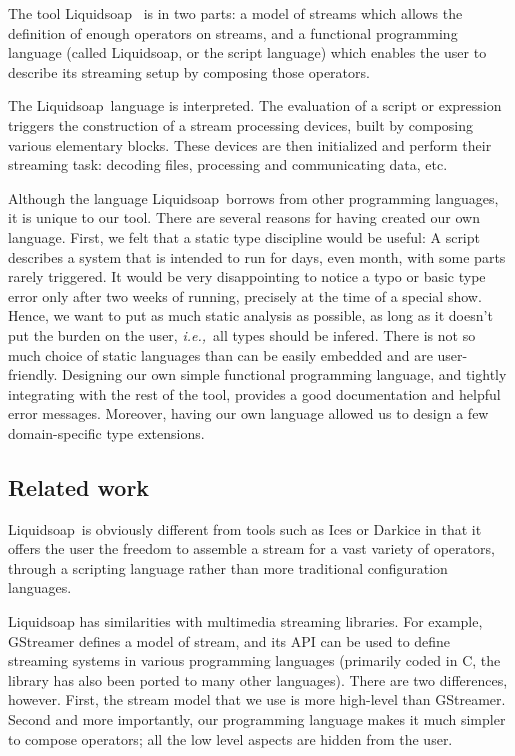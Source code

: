 \documentclass{llncs}
\newcommand{\liquidsoap}{Liquidsoap}
\newcommand{\ie}{{\em i.e.,}}
\begin{document}
The tool \liquidsoap\ \cite{liquidsoap} is in two parts:
  a model of streams which allows the definition of enough
  operators on streams, and a functional programming language
  (called \liquidsoap, or the script language) which enables
  the user to describe its streaming setup by composing those operators.

The \liquidsoap\ language is interpreted.
The evaluation of a script or expression triggers the construction
of a stream processing devices, built by composing various elementary
blocks.
These devices are then initialized and perform their streaming task:
decoding files, processing and communicating data, etc.


Although the language \liquidsoap\ borrows from other programming
languages, it is unique to our tool.
There are several reasons for having created our own language.
First, we felt that a static type discipline would be useful:
A script describes a system that is intended to run for days,
even month, with some parts rarely triggered.
It would be very disappointing to notice a typo or basic type
error only after two weeks of running, precisely at the time
of a special show.
Hence, we want to put as much static analysis as possible,
as long as it doesn't put the burden on the user,
\ie\ all types should be infered.
There is not so much choice of static languages than can be
easily embedded and are user-friendly.
Designing our own simple functional programming language,
and tightly integrating with the rest of the tool,
provides a good documentation and helpful error messages.
Moreover, having our own language allowed us to design
a few domain-specific type extensions.

\subsection{Related work}

\liquidsoap\ is obviously different from tools such as Ices or Darkice in
that it offers the user the freedom to assemble a stream
for a vast variety of operators, through a scripting
language rather than more traditional configuration languages.

Liquidsoap has similarities with multimedia streaming libraries.
For example, GStreamer defines a model of stream, and its API
can be used to define streaming systems in various programming
languages (primarily coded in C, the library has also been
ported to many other languages).
There are two differences, however.
First, the stream model that we use is more high-level than
GStreamer. %
Second and more importantly,
our programming language makes it much simpler
to compose operators; all the low level aspects are hidden
from the user.
\end{document}
